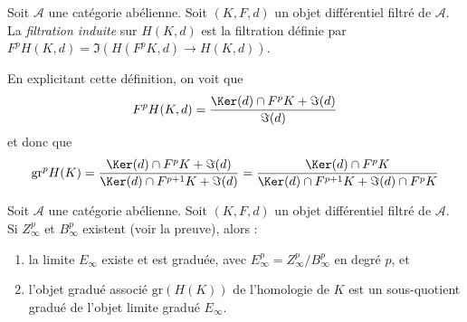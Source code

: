 \begin{definition}
\label{definition-filtration-cohomology-filtered-differential}
Soit $\mathcal{A}$ une catégorie abélienne.
Soit $(K, F, d)$ un objet différentiel filtré de $\mathcal{A}$.
La {\it filtration induite} sur $H(K, d)$ est la filtration définie
par $F^pH(K, d) = \Im(H(F^pK, d) \to H(K, d))$.
\end{definition}

\noindent
En explicitant cette définition, on voit que
$$
F^pH(K, d) =
\frac{\Ker(d) \cap F^pK + \Im(d)}{\Im(d)}
$$
et donc que
$$
\text{gr}^p H(K) =
\frac{\Ker(d) \cap F^pK + \Im(d)}{\Ker(d) \cap F^{p + 1}K + \Im(d)} =
\frac{\Ker(d) \cap F^pK}{\Ker(d) \cap F^{p + 1}K + \Im(d) \cap F^pK}
$$

\begin{lemma}
\label{lemma-compute-filtered-cohomology}
Soit $\mathcal{A}$ une catégorie abélienne. Soit $(K, F, d)$ un objet
différentiel filtré de $\mathcal{A}$. Si $Z_\infty^p$ et $B_\infty^p$
existent (voir la preuve), alors :
\begin{enumerate}
\item la limite $E_\infty$ existe et est graduée, avec
$E_\infty^p = Z_\infty^p/B_\infty^p$ en degré $p$, et
\item l'objet gradué associé $\text{gr}(H(K))$ de l'homologie de $K$
est un sous-quotient gradué de l'objet limite gradué $E_\infty$.
\end{enumerate}
\end{lemma}


